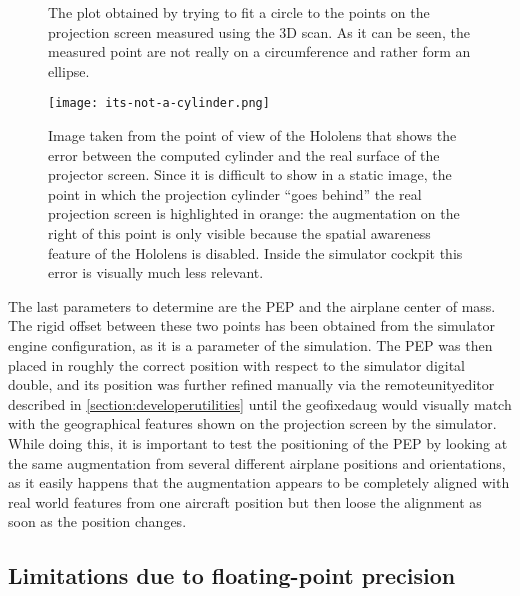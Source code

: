 \begin{figure}
  \centering
  
  \caption{The plot obtained by trying to fit a circle to the points on the projection screen measured using the 3D scan. As it can be seen, the measured point are not really on a circumference and rather form an ellipse.}\label{fig:it_is_not_a_cylinder.png}
\end{figure}

\begin{figure}
  \centering
  \texttt{[image: its-not-a-cylinder.png]}
  \caption{Image taken from the point of view of the Hololens that shows the error between the computed cylinder and the real surface of the projector screen. Since it is difficult to show in a static image, the point in which the projection cylinder \enquote{goes behind} the real projection screen is highlighted in orange: the augmentation on the right of this point is only visible because the spatial awareness feature of the Hololens is disabled. Inside the simulator cockpit this error is visually much less relevant.}\label{fig:aug_it_is_not_a_cylinder.png}
\end{figure}

The last parameters to determine are the \gls{PEP} and the airplane center of mass. The rigid offset between these two points has been obtained from the simulator engine configuration, as it is a parameter of the simulation. The \gls{PEP} was then placed in roughly the correct position with respect to the simulator digital double, and its position was further refined manually via the \gls{remoteunityeditor} described in \autoref{section:developerutilities} until the \gls{geofixedaug} would visually match with the geographical features shown on the projection screen by the simulator. While doing this, it is important to test the positioning of the \gls{PEP} by looking at the same augmentation from several different airplane positions and orientations, as it easily happens that the augmentation appears to be completely aligned with real world features from one aircraft position but then loose the alignment as soon as the position changes.

\subsection{Limitations due to floating-point precision}

